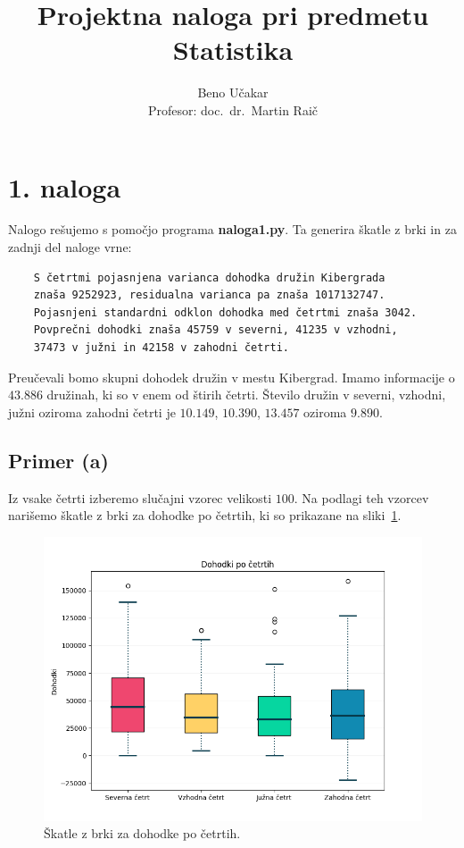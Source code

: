 \documentclass[a4paper,11pt]{article}
\begin{document}
\title{Projektna naloga pri predmetu Statistika}
\author{Beno Učakar \\ Profesor: doc.~dr.~Martin Raič}
\date{}


\maketitle


\section*{1. naloga}

Nalogo rešujemo s pomočjo programa \textbf{naloga1.py}. 
Ta generira škatle z brki in za zadnji del naloge vrne:
\begin{verbatim}
    S četrtmi pojasnjena varianca dohodka družin Kibergrada
    znaša 9252923, residualna varianca pa znaša 1017132747.
    Pojasnjeni standardni odklon dohodka med četrtmi znaša 3042.
    Povprečni dohodki znaša 45759 v severni, 41235 v vzhodni,
    37473 v južni in 42158 v zahodni četrti.
\end{verbatim}

Preučevali bomo skupni dohodek družin v mestu Kibergrad.
Imamo informacije o $43.886$ družinah, ki so v enem od štirih četrti. 
Število družin v severni, vzhodni, južni oziroma zahodni četrti je $10.149$, $10.390$, $13.457$ oziroma $9.890$.

\subsection*{Primer (a)}

Iz vsake četrti izberemo slučajni vzorec velikosti $100$. 
Na podlagi teh vzorcev narišemo škatle z brki za dohodke po četrtih, ki so prikazane na sliki~\ref{brke_po_cetrtih}.

\begin{figure}[H]
    \centering
    \includegraphics[scale=0.5]{Skatle_z_brki_Cetrti.png}
    \caption{Škatle z brki za dohodke po četrtih.}
    \label{brke_po_cetrtih}
\end{figure}
\end{document}
